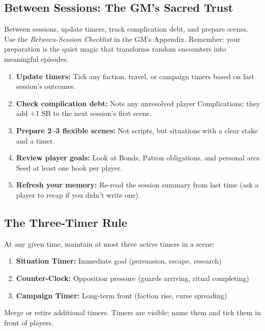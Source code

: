 \subsection{Between Sessions: The GM's Sacred Trust}
\label{sec:between-sessions}

Between sessions, update timers, track complication debt, and prepare scenes. Use the \textit{Between-Session Checklist} in the GM's Appendix. Remember: your preparation is the quiet magic that transforms random encounters into meaningful episodes.

\begin{tcolorbox}[colback=green!5!white, colframe=green!75!black, title=Between-Session Checklist,breakable]
\begin{enumerate}
  \item \textbf{Update timers:} Tick any faction, travel, or campaign timers based on last session's outcomes.
  \item \textbf{Check complication debt:} Note any unresolved player Complications; they add +1 SB to the next session's first scene.
  \item \textbf{Prepare 2--3 flexible scenes:} Not scripts, but situations with a clear stake and a timer.
  \item \textbf{Review player goals:} Look at Bonds, Patron obligations, and personal arcs. Seed at least one hook per player.
  \item \textbf{Refresh your memory:} Re-read the session summary from last time (ask a player to recap if you didn't write one).
\end{enumerate}
\end{tcolorbox}

\subsection{The Three-Timer Rule}
At any given time, maintain at most three active timers in a scene:
\begin{enumerate}
  \item \textbf{Situation Timer:} Immediate goal (persuasion, escape, research)
  \item \textbf{Counter-Clock:} Opposition pressure (guards arriving, ritual completing)
  \item \textbf{Campaign Timer:} Long-term front (faction rise, curse spreading)
\end{enumerate}
Merge or retire additional timers. Timers are visible; name them and tick them in front of players.

